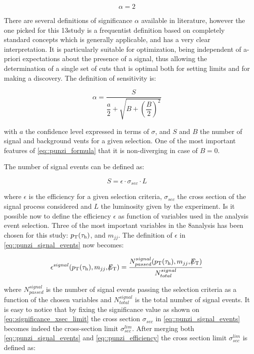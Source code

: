 \begin{equation}
\alpha = 2
\label{eq::significance_xsec_limit}
\end{equation}

There are several definitions of significance $\alpha$ available in literature, however the one picked for this 13\tev study is a frequentist definition based on completely standard concepts\cite{Punzi:2003bu} which is generally applicable, and has a very clear interpretation. It is particularly suitable for optimization, being independent of a-priori expectations about the presence of a signal, thus allowing the determination of a single set of cuts that is optimal both for setting limits and for making a discovery. The definition of sensitivity is:

\begin{equation}
\alpha = \dfrac{S}{\dfrac{a}{2} + \sqrt{B + \left( \dfrac{B}{2}\right)^{2}}}
\label{eq::punzi_formula}
\end{equation}

with $a$ the confidence level expressed in terms of $\sigma$, and $S$ and $B$ the number of signal and background vents for a given selection. One of the most important features of \autoref{eq::punzi_formula} that it is non-diverging in case of $B = 0$.

The number of signal events can be defined as:

\begin{equation}
S = \epsilon \cdot \sigma_{sec} \cdot L
\label{eq::punzi_signal_events}
\end{equation}

where $\epsilon$ is the efficiency for a given selection criteria, $\sigma_{sec}$ the cross section of the signal process considered and $L$ the luminosity given by the experiment. Is it possible now to define the efficiency $\epsilon$ as function of variables used in the analysis event selection. Three of the most important variables in the 8\tev analysis has been chosen for this study: $p_{\text{T}}(\tau_{\text{h}})$, \met and $m_{jj}$. The definition of $\epsilon$ in \autoref{eq::punzi_signal_events} now becomes:

\begin{equation}
\epsilon^{signal} ( p_{\text{T}}(\tau_{\text{h}}) , m_{jj} ,  \slash\mkern-12mu{E}_{\text{T}} ) = \dfrac{N^{signal}_{passed}(p_{\text{T}}(\tau_{\text{h}}) , m_{jj} ,  \slash\mkern-12mu{E}_{\text{T}})}{N^{signal}_{total}}
\label{eq::punzi_efficiency}
\end{equation}

where $N^{signal}_{passed}$ is the number of signal events passing the selection criteria as a function of the chosen variables and $N^{signal}_{total}$ is the total number of signal events. It is easy to notice that by fixing the significance value as shown on \autoref{eq::significance_xsec_limit} the cross section $\sigma_{sec}$ in \autoref{eq::punzi_signal_events} becomes indeed the cross-section limit $\sigma^{lim}_{sec}$. After merging both \autoref{eq::punzi_signal_events} and \autoref{eq::punzi_efficiency} the cross section limit $\sigma^{lim}_{sec}$ is defined as:
	
